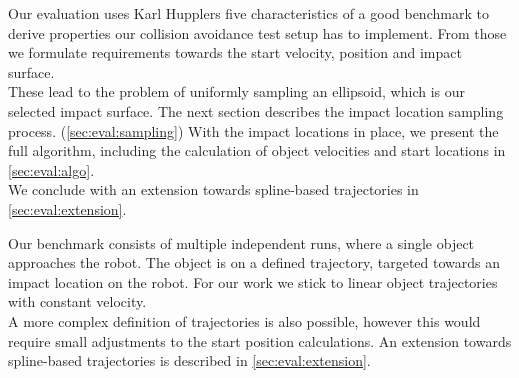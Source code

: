 \par
Our evaluation uses Karl Hupplers five characteristics of a good benchmark to derive properties our collision avoidance test setup has to implement.
From those we formulate requirements towards the start velocity, position and impact surface.
\\
These lead to the problem of uniformly sampling an ellipsoid, which is our selected impact surface.
The next section describes the impact location sampling process. (\cref{sec:eval:sampling})
With the impact locations in place, we present the full algorithm, including the calculation of object velocities and start locations in \cref{sec:eval:algo}.
\\
We conclude with an extension towards spline-based trajectories in \cref{sec:eval:extension}.

Our benchmark consists of multiple independent runs, where a single object approaches the robot.
The object is on a defined trajectory, targeted towards an impact location on the robot.
For our work we stick to linear object trajectories with constant velocity.
\\
A more complex definition of trajectories is also possible, however this would require small adjustments to the start position calculations.
An extension towards spline-based trajectories is described in \cref{sec:eval:extension}.
